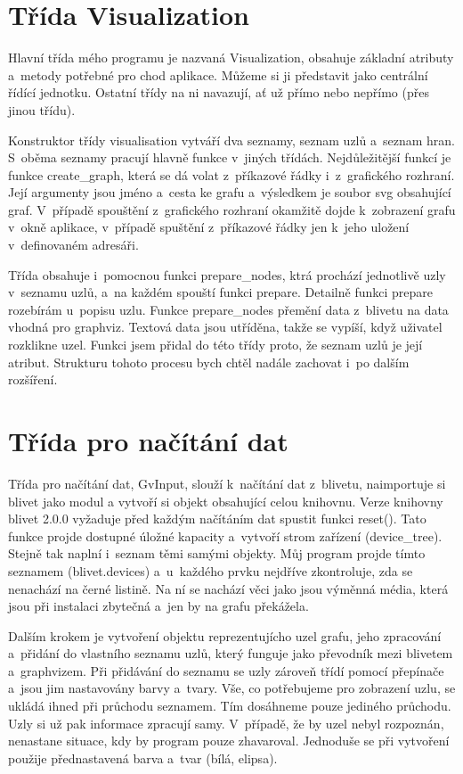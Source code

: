 \documentclass[color,table,oneside,nolot,nolof]{fithesis}
\begin{document}
\section{Třída Visualization}
	Hlavní třída mého programu je nazvaná Visualization, obsahuje základní atributy a~metody potřebné pro chod aplikace. Můžeme si ji představit jako centrální řídící jednotku. Ostatní
	třídy na ni navazují, ať už přímo nebo nepřímo (přes jinou třídu). 

	Konstruktor třídy visualisation vytváří dva seznamy, seznam uzlů a~seznam hran. S~oběma seznamy pracují hlavně funkce v~jiných třídách. Nejdůležitější funkcí
	je funkce create\_graph, která se dá volat z~příkazové řádky i~z~grafického rozhraní. Její argumenty jsou jméno a~cesta ke grafu a~výsledkem je soubor svg obsahující graf. 
	V~případě spouštění z~grafického rozhraní okamžitě dojde k~zobrazení grafu v~okně aplikace, v~případě spuštění z~příkazové řádky jen k~jeho uložení v~definovaném adresáři. 

	Třída obsahuje i~pomocnou funkci prepare\_nodes, ktrá prochází jednotlivě uzly v~seznamu uzlů, a~na každém spouští funkci prepare. Detailně funkci prepare rozebírám u~popisu uzlu. Funkce prepare\_nodes
	přemění data z~blivetu na data vhodná pro graphviz. Textová data jsou utříděna, takže se vypíší, když uživatel rozklikne uzel. Funkci jsem přidal do této třídy proto, že 
	seznam uzlů je její atribut. Strukturu tohoto procesu bych chtěl nadále zachovat i~po dalším rozšíření.  

\section{Třída pro načítání dat}
	Třída pro načítání dat, GvInput, slouží k~načítání dat z~blivetu, naimportuje si blivet jako modul a vytvoří si objekt obsahující celou knihovnu. Verze knihovny blivet 2.0.0 vyžaduje před 
	každým načítáním dat spustit funkci reset(). Tato funkce projde dostupné úložné kapacity a~vytvoří strom zařízení (device\_tree). Stejně tak naplní i~seznam těmi
	samými objekty. Můj program projde tímto seznamem (blivet.devices) a~u~každého prvku nejdříve zkontroluje, zda se nenachází na černé listině. Na ní se nachází věci jako jsou 
	výměnná média, která jsou při instalaci zbytečná a~jen by na grafu překážela.

	Dalším krokem je vytvoření objektu reprezentujícho uzel grafu, jeho zpracování a~přidání do vlastního seznamu uzlů, který funguje jako převodník mezi blivetem a~graphvizem. Při
	přidávání do seznamu se uzly zároveň třídí pomocí přepínače a~jsou jim nastavovány barvy a~tvary. Vše, co potřebujeme pro zobrazení uzlu, se ukládá ihned při průchodu seznamem. 
	Tím dosáhneme pouze jediného průchodu. Uzly si už pak informace zpracují samy. V~případě, že by uzel nebyl rozpoznán, nenastane situace, kdy by program pouze zhavaroval. Jednoduše 
	se při vytvoření použije přednastavená barva a~tvar (bílá, elipsa).
\end{document}
